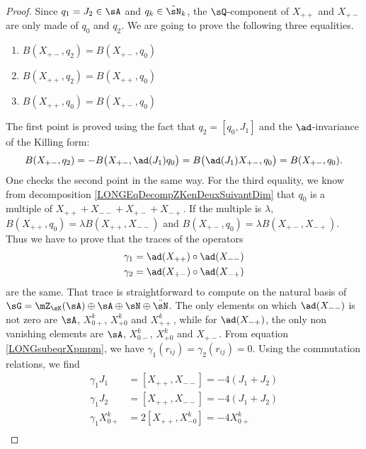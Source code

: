 \begin{proof}
	Since $q_1=J_2\in\sA$ and $q_k\in\tilde\sN_k$, the $\sQ$-component of $X_{++}$ and $X_{+-}$ are only made of $q_0$ and $q_2$.
	We are	going to prove the following three equalities.
	\begin{enumerate}

		\item\label{LONGItemBpmqDeux}
		      $B(X_{+-},q_2)=B(X_{+-},q_0)$
		\item
		      $B(X_{++},q_2)=B(X_{++},q_0)$
		\item
		      $B(X_{++},q_0)=B(X_{+-},q_0)$
	\end{enumerate}

	The first point is proved using the fact that $q_2=[q_0,J_1]$ and the $\ad$-invariance of the Killing form:
	\begin{equation}
		B(X_{+-},q_2)=-B\big( X_{+-},\ad(J_1)q_0 \big)=B\big( \ad(J_1)X_{+-},q_0 \big)=B(X_{+-},q_0).
	\end{equation}
	One checks the second point in the same way. For the third equality, we know from decomposition \eqref{LONGEqDecompZKenDeuxSuivantDim} that $q_0$ is a multiple of $X_{++}+X_{--}+X_{+-}+X_{-+}$. If the multiple is $\lambda$, $B(X_{++},q_0)=\lambda B(X_{++},X_{--})$ and $B(X_{+-},q_0)=\lambda B(X_{+-},X_{-+})$. Thus we have to prove that the traces of the operators
	\begin{equation}
		\begin{aligned}[]
			\gamma_1 & =\ad(X_{++})\circ\ad(X_{--}) \\
			\gamma_2 & =\ad(X_{+-})\circ\ad(X_{-+})
		\end{aligned}
	\end{equation}
	are the same. That trace is straightforward to compute on the natural basis of $\sG=\mZ_{\sK}(\sA)\oplus\sA\oplus\sN\oplus\bar\sN$.
	The only elements on which $\ad(X_{--})$ is not zero are $\sA$, $X^k_{0+}$, $X^k_{+0}$ and $X^k_{++}$, while for $\ad(X_{-+})$, the only non vanishing elements are $\sA$, $X^k_{0-}$, $X^k_{+0}$ and $X_{+-}$. From equation \eqref{LONGsubeqrXpmpm}, we have $\gamma_1(r_{ij})=\gamma_2(r_{ij})=0$. Using the commutation relations, we find
	\begin{subequations}
		\begin{align}
			\gamma_1J_1      & =[X_{++},X_{--}]=-4(J_1+J_2)    \\
			\gamma_1J_2      & =[X_{++},X_{--}]=-4(J_1+J_2)    \\
			\gamma_1X^k_{0+} & =2[X_{++},X^k_{-0}]=-4X^k_{0+}  \\

\end{align}
\end{subequations}
\end{proof}
